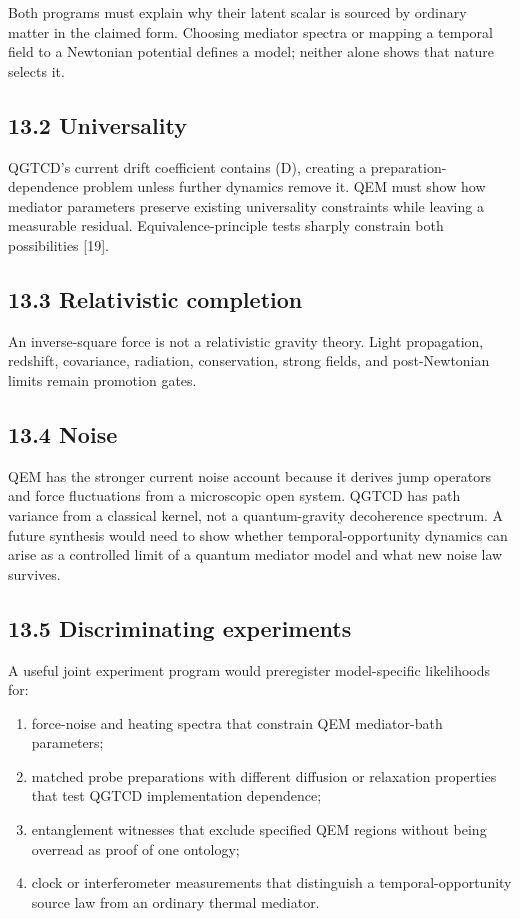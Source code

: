 \documentclass[
  american,
  11pt,
  letterpaper,
]{article}
\providecommand{\tightlist}{%
  \setlength{\itemsep}{0pt}\setlength{\parskip}{0pt}}
\begin{document}
Both programs must explain why their latent scalar is sourced by ordinary matter in the claimed form. Choosing mediator spectra or mapping a temporal field to a Newtonian potential defines a model; neither alone shows that nature selects it.

\subsection{13.2 Universality}\label{universality}

QGTCD's current drift coefficient contains (D), creating a preparation-dependence problem unless further dynamics remove it. QEM must show how mediator parameters preserve existing universality constraints while leaving a measurable residual. Equivalence-principle tests sharply constrain both possibilities {[}19{]}.

\subsection{13.3 Relativistic completion}\label{relativistic-completion}

An inverse-square force is not a relativistic gravity theory. Light propagation, redshift, covariance, radiation, conservation, strong fields, and post-Newtonian limits remain promotion gates.

\subsection{13.4 Noise}\label{noise}

QEM has the stronger current noise account because it derives jump operators and force fluctuations from a microscopic open system. QGTCD has path variance from a classical kernel, not a quantum-gravity decoherence spectrum. A future synthesis would need to show whether temporal-opportunity dynamics can arise as a controlled limit of a quantum mediator model and what new noise law survives.

\subsection{13.5 Discriminating experiments}\label{discriminating-experiments}

A useful joint experiment program would preregister model-specific likelihoods for:

\begin{enumerate}
\def\labelenumi{\arabic{enumi}.}
\tightlist
\item
  force-noise and heating spectra that constrain QEM mediator-bath parameters;
\item
  matched probe preparations with different diffusion or relaxation properties that test QGTCD implementation dependence;
\item
  entanglement witnesses that exclude specified QEM regions without being overread as proof of one ontology;
\item
  clock or interferometer measurements that distinguish a temporal-opportunity source law from an ordinary thermal mediator.
\end{enumerate}
\end{document}
